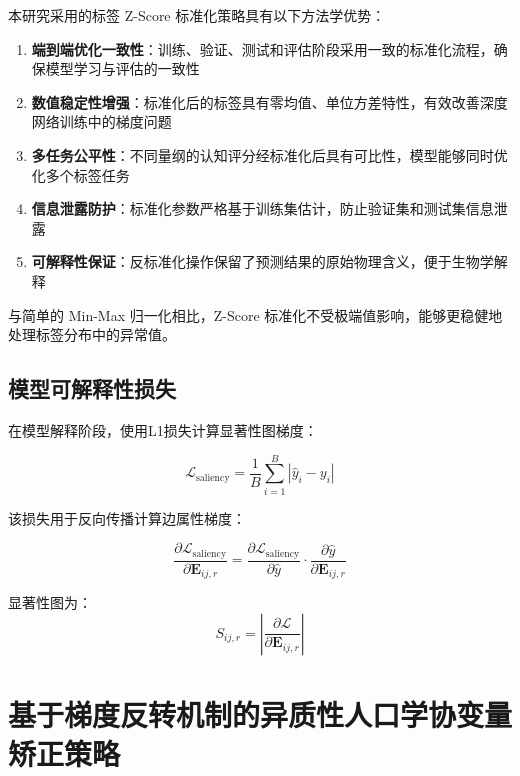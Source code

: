 \documentclass[UTF8, a4paper, 12pt]{article}
\begin{document}
本研究采用的标签 Z-Score 标准化策略具有以下方法学优势：

\begin{enumerate}
    \item \textbf{端到端优化一致性}：训练、验证、测试和评估阶段采用一致的标准化流程，确保模型学习与评估的一致性
    
    \item \textbf{数值稳定性增强}：标准化后的标签具有零均值、单位方差特性，有效改善深度网络训练中的梯度问题
    
    \item \textbf{多任务公平性}：不同量纲的认知评分经标准化后具有可比性，模型能够同时优化多个标签任务
    
    \item \textbf{信息泄露防护}：标准化参数严格基于训练集估计，防止验证集和测试集信息泄露
    
    \item \textbf{可解释性保证}：反标准化操作保留了预测结果的原始物理含义，便于生物学解释
\end{enumerate}

与简单的 Min-Max 归一化相比，Z-Score 标准化不受极端值影响，能够更稳健地处理标签分布中的异常值。

\newpage

\subsection{模型可解释性损失}

在模型解释阶段，使用L1损失计算显著性图梯度：

\begin{equation}
\mathcal{L}_{\text{saliency}} = \frac{1}{B} \sum_{i=1}^{B} | \hat{y}_i - y_i |
\end{equation}

该损失用于反向传播计算边属性梯度：

\begin{equation}
\frac{\partial \mathcal{L}_{\text{saliency}}}{\partial \mathbf{E}_{ij,r}} = \frac{\partial \mathcal{L}_{\text{saliency}}}{\partial \hat{y}} \cdot \frac{\partial \hat{y}}{\partial \mathbf{E}_{ij,r}}
\end{equation}

显著性图为：
\begin{equation}
S_{ij,r} = \left| \frac{\partial \mathcal{L}}{\partial \mathbf{E}_{ij,r}} \right|
\end{equation}

\newpage

\section{基于梯度反转机制的异质性人口学协变量矫正策略}
\end{document}
